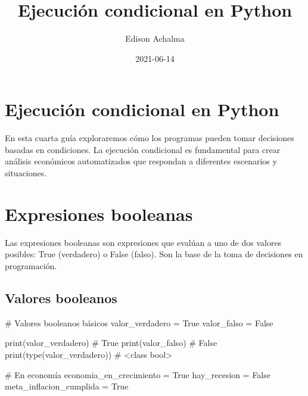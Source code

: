 \documentclass[
  doc,
  floatsintext,
  longtable,
  a4paper,
  nolmodern,
  notxfonts,
  notimes,
  12pt,
  colorlinks=true,linkcolor=blue,citecolor=blue,urlcolor=blue]{apa7}
\title{Ejecución condicional en Python}
\author{Edison Achalma}
\affiliation{
{Escuela Profesional de Economía, Universidad Nacional de San Cristóbal
de Huamanga}}
\date{2021-06-14}
\newenvironment{Shaded}{\begin{snugshade}}{\end{snugshade}}
\newcommand{\BuiltInTok}[1]{\textcolor[rgb]{0.00,0.23,0.31}{#1}}
\newcommand{\CommentTok}[1]{\textcolor[rgb]{0.37,0.37,0.37}{#1}}
\newcommand{\NormalTok}[1]{\textcolor[rgb]{0.00,0.23,0.31}{#1}}
\newcommand{\OperatorTok}[1]{\textcolor[rgb]{0.37,0.37,0.37}{#1}}
\newcommand{\VariableTok}[1]{\textcolor[rgb]{0.07,0.07,0.07}{#1}}
\begin{document}
\maketitle


\hypertarget{toc}{}
\tableofcontents
\newpage
\section[Introduction]{Ejecución condicional en Python}

\setcounter{secnumdepth}{3}

\setlength\LTleft{0pt}




En esta cuarta guía exploraremos cómo los programas pueden tomar
decisiones basadas en condiciones. La ejecución condicional es
fundamental para crear análisis económicos automatizados que respondan a
diferentes escenarios y situaciones.

\section{Expresiones booleanas}\label{expresiones-booleanas}

Las expresiones booleanas son expresiones que evalúan a uno de dos
valores posibles: True (verdadero) o False (falso). Son la base de la
toma de decisiones en programación.

\subsection{Valores booleanos}\label{valores-booleanos}

\begin{Shaded}
\begin{Highlighting}[]
\CommentTok{\# Valores booleanos básicos}
\NormalTok{valor\_verdadero }\OperatorTok{=} \VariableTok{True}
\NormalTok{valor\_falso }\OperatorTok{=} \VariableTok{False}

\BuiltInTok{print}\NormalTok{(valor\_verdadero)  }\CommentTok{\# True}
\BuiltInTok{print}\NormalTok{(valor\_falso)      }\CommentTok{\# False}
\BuiltInTok{print}\NormalTok{(}\BuiltInTok{type}\NormalTok{(valor\_verdadero))  }\CommentTok{\# \textless{}class \textquotesingle{}bool\textquotesingle{}\textgreater{}}

\CommentTok{\# En economía}
\NormalTok{economia\_en\_crecimiento }\OperatorTok{=} \VariableTok{True}
\NormalTok{hay\_recesion }\OperatorTok{=} \VariableTok{False}
\NormalTok{meta\_inflacion\_cumplida }\OperatorTok{=} \VariableTok{True}
\end{Highlighting}
\end{Shaded}
\end{document}
